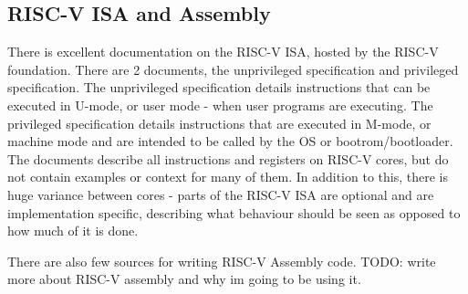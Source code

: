 \subsection{RISC-V ISA and Assembly}
There is excellent documentation on the RISC-V ISA, hosted by the RISC-V foundation. There are 2 documents, the unprivileged specification and privileged specification. The unprivileged specification details instructions that can be executed in U-mode, or user mode - when user programs are executing. The privileged specification details instructions that are executed in M-mode, or machine mode and are intended to be called by the OS or bootrom/bootloader. The documents describe all instructions and registers on RISC-V cores, but do not contain examples or context for many of them. In addition to this, there is huge variance between cores - parts of the RISC-V ISA are optional and are implementation specific, describing what behaviour should be seen as opposed to how much of it is done.

There are also few sources for writing RISC-V Assembly code. TODO: write more about RISC-V assembly and why im going to be using it.